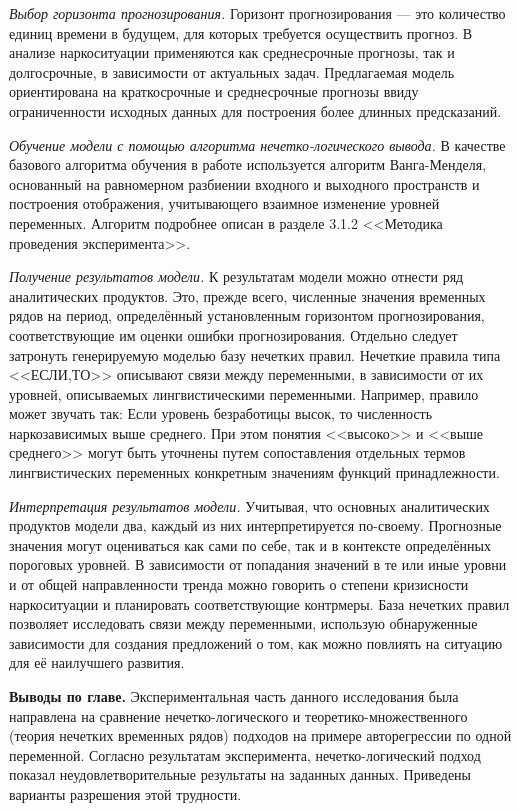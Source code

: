 \textit{Выбор горизонта прогнозирования.} Горизонт прогнозирования --- это
количество единиц времени в будущем, для которых требуется осуществить прогноз.
В анализе наркоситуации применяются как среднесрочные прогнозы, так и
долгосрочные, в зависимости от актуальных задач.  Предлагаемая модель
ориентирована на краткосрочные и среднесрочные прогнозы ввиду ограниченности
исходных данных для построения более длинных предсказаний.

\textit{Обучение модели с помощью алгоритма нечетко-логического вывода.}
В качестве базового алгоритма обучения в работе используется  алгоритм
Ванга-Менделя, основанный на равномерном разбиении входного и выходного
пространств и построения отображения, учитывающего взаимное изменение уровней
переменных. Алгоритм подробнее описан в разделе 3.1.2 <<Методика проведения
эксперимента>>.

\textit{Получение результатов модели.} К результатам модели можно отнести ряд
аналитических продуктов. Это, прежде всего, численные значения временных рядов
на период, определённый установленным горизонтом прогнозирования,
соответствующие им оценки ошибки прогнозирования. Отдельно следует затронуть
генерируемую моделью базу нечетких правил. Нечеткие правила типа <<ЕСЛИ,ТО>>
описывают связи между переменными, в зависимости от их уровней, описываемых
лингвистическими переменными. Например, правило может звучать так: Если уровень
безработицы высок, то численность наркозависимых выше среднего. При этом понятия
<<высоко>> и <<выше среднего>> могут быть уточнены путем сопоставления отдельных
термов лингвистических переменных конкретным значениям функций принадлежности.

\textit{Интерпретация результатов модели.} Учитывая, что основных аналитических
продуктов модели два, каждый из них интерпретируется по-своему. Прогнозные
значения могут оцениваться как сами по себе, так и в контексте определённых
пороговых уровней. В зависимости от попадания значений в те или иные уровни и от
общей направленности тренда можно говорить о степени кризисности наркоситуации и
планировать соответствующие контрмеры. База нечетких правил позволяет
исследовать связи между переменными, использую обнаруженные зависимости для
создания предложений о том, как можно повлиять на ситуацию для её наилучшего
развития.

\textbf{Выводы по главе.} Экспериментальная часть данного исследования была
направлена на сравнение нечетко-логического и теоретико-множественного (теория
нечетких временных рядов) подходов на примере авторегрессии по одной переменной.
Согласно результатам эксперимента, нечетко-логический подход показал
неудовлетворительные результаты на заданных данных. Приведены варианты
разрешения этой трудности.

